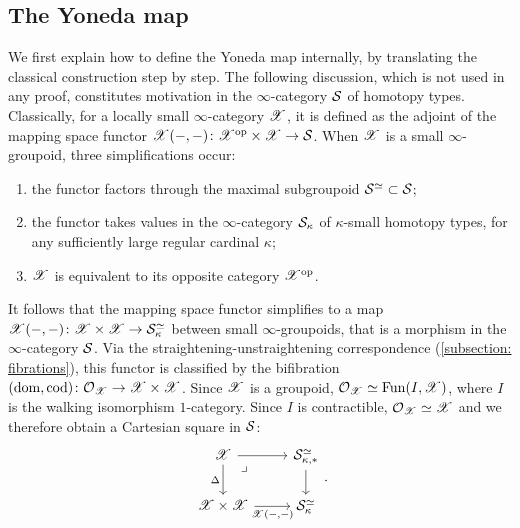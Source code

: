 \documentclass[twoside,a4paper,11pt]{amsart}
\begin{document}
\subsection{The Yoneda map}\label{subsection: the Yoneda map}
We first explain how to define the Yoneda map internally, by translating the classical construction step by step. The following discussion, which is not used in any proof, constitutes motivation in the $\infty$-category $\mathcal{S}$ of homotopy types. Classically, for a locally small $\infty$-category $\mathscr{X}$, it is defined as the adjoint of the mapping space functor $\mathscr{X}(-,-)\colon \mathscr{X}^{\mathrm{op}}\times\mathscr{X}\to \mathcal{S}$. When $\mathscr{X}$ is a small $\infty$-groupoid, three simplifications occur:
\begin{enumerate}
    \item the functor factors through the maximal subgroupoid $\mathcal{S}^\simeq\subset\mathcal{S}$;
    \item the functor takes values in the $\infty$-category $\mathcal{S}_\kappa$ of $\kappa$-small homotopy types, for any sufficiently large regular cardinal $\kappa$;
    \item $\mathscr{X}$ is equivalent to its opposite category $\mathscr{X}^{\mathrm{op}}$.
\end{enumerate}
It follows that the mapping space functor simplifies to a map $\mathscr{X}(-,-)\colon \mathscr{X}\times\mathscr{X}\to \mathcal{S}_\kappa^\simeq$ between small $\infty$-groupoids, that is a morphism in the $\infty$-category $\mathcal{S}$. Via the straightening-unstraightening correspondence (\cref{subsection: fibrations}), this functor is classified by the bifibration $(\mathrm{dom,cod})\colon \mathcal{O}_{\mathscr{X}}\to \mathscr{X}\times\mathscr{X}$. Since $\mathscr{X}$ is a groupoid, $\mathcal{O}_{\mathscr{X}}\simeq \mathrm{Fun}(I,\mathscr{X})$, where $I$ is the walking isomorphism $1$-category. Since $I$ is contractible, $\mathcal{O}_{\mathscr{X}}\simeq\mathscr{X}$ and we therefore obtain a Cartesian square in $\mathcal{S}$:
\[\begin{tikzcd}
    {\X} \arrow[r] \arrow[d, "\Delta"'] \arrow[dr, phantom, "\lrcorner"{anchor=center, pos=0.125}] & {\Sp_{\kappa,\ast}^\simeq} \arrow[d] \\
    {\X \times \X} \arrow[r, "{\X(-,-)}"'] & {\Sp_\kappa^\simeq}
\end{tikzcd}.\]
\end{document}
